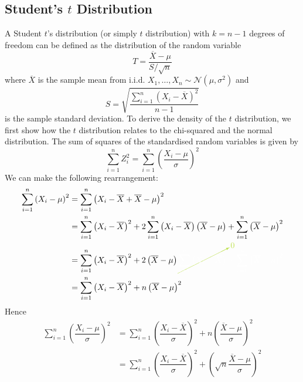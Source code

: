 \documentclass[11pt]{report} %
\begin{document}
\subsection{Student's $t$ Distribution}

A Student $t$'s distribution (or simply $t$ distribution) with $k = n - 1$ degrees of freedom can be defined as the distribution of the random variable
\begin{equation}
T = \dfrac{\overline{X} - \mu}{S/\sqrt{n}}
\end{equation}
where $\overline{X}$ is the sample mean from i.i.d. $X_{1}, \dots, X_{n} \sim \mathcal{N}\left(\mu, \sigma^{2}\right)$ and
\begin{equation}
S = \sqrt{\dfrac{\sum_{i = 1}^{n}\left(X_{i} - \overline{X}\right)^{2}}{n - 1}}
\end{equation}
is the sample standard deviation. To derive the density of the $t$ distribution, we first show how the $t$ distribution relates to the chi-squared and the normal distribution. The sum of squares of the standardised random variables is given by
\begin{equation}
\sum_{i = 1}^{n}Z_{i}^{2} = \sum_{i = 1}^{n}\left(\dfrac{X_{i} - \mu}{\sigma}\right)^{2}
\end{equation}
We can make the following rearrangement:
\begin{align}
\sum_{i = 1}^{n}\left(X_{i} - \mu\right)^{2} &= \sum_{i = 1}^{n}\left(X_{i} -  \overline{X} + \overline{X} - \mu\right)^{2} \\
&= \sum_{i=1}^{n}\left(X_{i}-\overline{X}\right)^{2}+2\sum_{i=1}^{n}\left(X_{i}-\overline{X}\right)\left(\overline{X}-\mu\right)+\sum_{i=1}^{n}\left(\overline{X}-\mu\right)^{2} \\
&= \sum_{i=1}^{n}\left(X_{i}-\overline{X}\right)^{2}+2\left(\overline{X}-\mu\right)\green\cancelto{0}{\black\sum_{i=1}^{n}\left(X_{i}-\overline{X}\right)}\black+\sum_{i=1}^{n}\left(\overline{X}-\mu\right)^{2} \\
&= \sum_{i=1}^{n}\left(X_{i}-\overline{X}\right)^{2}+n\left(\overline{X}-\mu\right)^{2}
\end{align}
Hence
\begin{align}
\sum_{i = 1}^{n}\left(\dfrac{X_{i} - \mu}{\sigma}\right)^{2} &= \sum_{i=1}^{n}\left(\dfrac{X_{i}-\overline{X}}{\sigma}\right)^{2}+n\left(\dfrac{\overline{X}-\mu}{\sigma}\right)^{2} \\
&= \sum_{i=1}^{n}\left(\dfrac{X_{i}-\overline{X}}{\sigma}\right)^{2}+\left(\sqrt{n}\dfrac{\overline{X}-\mu}{\sigma}\right)^{2}
\end{align}
\end{document}
